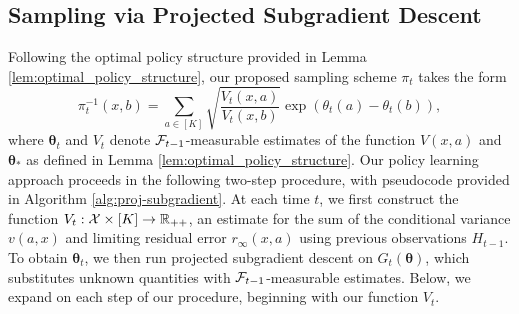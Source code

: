 \documentclass{article}
\begin{document}
\subsection{Sampling via Projected Subgradient Descent}
Following the optimal policy structure provided in Lemma \ref{lem:optimal_policy_structure}, our proposed sampling scheme $\pi_t$ takes the form
\begin{equation}
    \pi_t^{-1}(x,b) = \sum_{a \in [K]} \sqrt{\frac{V_t(x,a)}{V_t(x,b)}} \exp(\theta_t(a) - \theta_t(b)),
\end{equation}
where $\bm{\theta}_t$ and $V_t$ denote $\mathcal{F}_{t-1}$-measurable estimates of the function $V(x,a)$ and $\bm{\theta}_*$ as defined in Lemma \ref{lem:optimal_policy_structure}. Our policy learning approach proceeds in the following two-step procedure, with pseudocode provided in Algorithm \ref{alg:proj-subgradient}. At each time $t$, we first construct the function $V_{t}: \mathcal{X} \times [K] \rightarrow \mathbb{R}_{++}$, an estimate for the sum of the conditional variance $v(a,x)$ and limiting residual error $r_\infty(x,a)$ using previous observations $H_{t-1}$. To obtain $\bm{\theta}_t$, we then run projected subgradient descent on $G_t(\bm{\theta})$, which substitutes unknown quantities with $\mathcal{F}_{t-1}$-measurable estimates. Below, we expand on each step of our procedure, beginning with our function $V_t$. 
\end{document}
